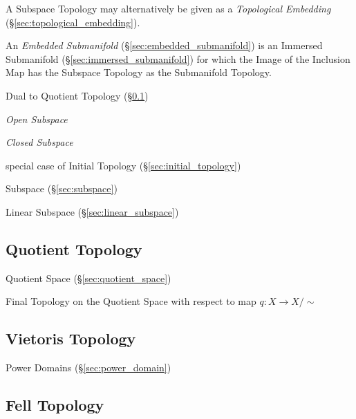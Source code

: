 A Subspace Topology may alternatively be given as a \emph{Topological
  Embedding} (\S\ref{sec:topological_embedding}).

An \emph{Embedded Submanifold} (\S\ref{sec:embedded_submanifold}) is an
Immersed Submanifold (\S\ref{sec:immersed_submanifold}) for which the Image of
the Inclusion Map has the Subspace Topology as the Submanifold Topology.

Dual to Quotient Topology (\S\ref{sec:quotient_topology})

\emph{Open Subspace}

\emph{Closed Subspace}

special case of Initial Topology (\S\ref{sec:initial_topology})

\fist Subspace (\S\ref{sec:subspace})

\fist Linear Subspace (\S\ref{sec:linear_subspace})



\subsection{Quotient Topology}\label{sec:quotient_topology}

Quotient Space (\S\ref{sec:quotient_space})

Final Topology on the Quotient Space with respect to map $q : X
\rightarrow X / \sim$



\subsection{Vietoris Topology}\label{sec:vietoris_topology}

\fist Power Domains (\S\ref{sec:power_domain})



\subsection{Fell Topology}\label{sec:fell_topology}

